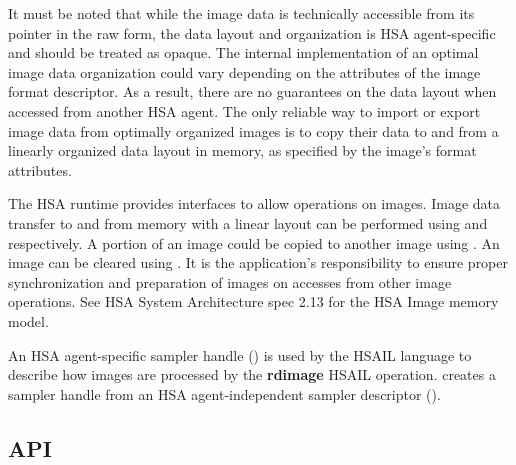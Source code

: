 \documentclass[final,oneside]{book}
\newcommand{\reffun}[1]{\textbf{#1}}
\newcommand{\refhsl}[1]{\reffun{#1}}
\begin{document}
It must be noted that while the image data is technically accessible from its
pointer in the raw form, the data layout and organization is HSA agent-specific
and should be treated as opaque. The internal implementation of an optimal image
data organization could vary depending on the attributes of the image format
descriptor. As a result, there are no guarantees on the data layout when
accessed from another HSA agent. The only reliable way to import or export image
data from optimally organized images is to copy their data to and from a
linearly organized data layout in memory, as specified by the image's format
attributes.

The HSA runtime provides interfaces to allow operations on images. Image data
transfer to and from memory with a linear layout can be performed using
 and  respectively. A
portion of an image could be copied to another image using
. An image can be cleared using
. It is the application's responsibility to ensure
proper synchronization and preparation of images on accesses from other image
operations. See HSA System Architecture spec 2.13 for the HSA Image memory
model.

An HSA agent-specific sampler handle () is used
by the HSAIL language to describe how images are processed by the
\refhsl{rdimage} HSAIL operation.  creates
a sampler handle from an HSA agent-independent sampler descriptor
().

\subsection{API}




\appendix
\end{document}
